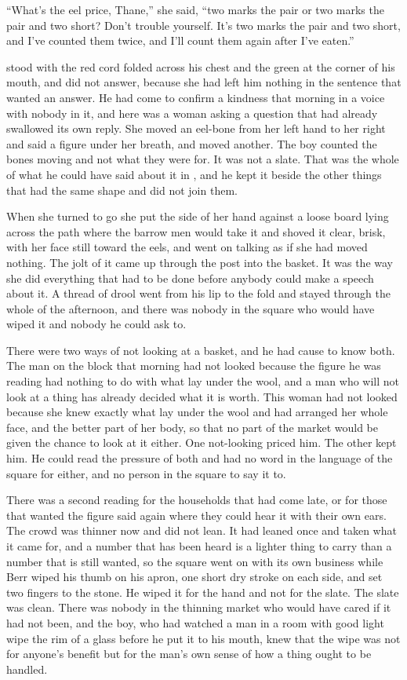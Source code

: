 “What's the eel price, Thane,” she said, “two marks the pair or two marks the pair and two short? Don't trouble yourself. It's two marks the pair and two short, and I've counted them twice, and I'll count them again after I've eaten.”

 stood with the red cord folded across his chest and the green at the corner of his mouth, and did not answer, because she had left him nothing in the sentence that wanted an answer. He had come to confirm a kindness that morning in a voice with nobody in it, and here was a woman asking a question that had already swallowed its own reply. She moved an eel-bone from her left hand to her right and said a figure under her breath, and moved another. The boy counted the bones moving and not what they were for. It was not a slate. That was the whole of what he could have said about it in , and he kept it beside the other things that had the same shape and did not join them.

When she turned to go she put the side of her hand against a loose board lying across the path where the barrow men would take it and shoved it clear, brisk, with her face still toward the eels, and went on talking as if she had moved nothing. The jolt of it came up through the post into the basket. It was the way she did everything that had to be done before anybody could make a speech about it. A thread of drool went from his lip to the fold and stayed through the whole of the afternoon, and there was nobody in the square who would have wiped it and nobody he could ask to.

There were two ways of not looking at a basket, and he had cause to know both. The man on the block that morning had not looked because the figure he was reading had nothing to do with what lay under the wool, and a man who will not look at a thing has already decided what it is worth. This woman had not looked because she knew exactly what lay under the wool and had arranged her whole face, and the better part of her body, so that no part of the market would be given the chance to look at it either. One not-looking priced him. The other kept him. He could read the pressure of both and had no word in the language of the square for either, and no person in the square to say it to.

\scenebreak

There was a second reading for the households that had come late, or for those that wanted the figure said again where they could hear it with their own ears. The crowd was thinner now and did not lean. It had leaned once and taken what it came for, and a number that has been heard is a lighter thing to carry than a number that is still wanted, so the square went on with its own business while Berr wiped his thumb on his apron, one short dry stroke on each side, and set two fingers to the stone. He wiped it for the hand and not for the slate. The slate was clean. There was nobody in the thinning market who would have cared if it had not been, and the boy, who had watched a man in a room with good light wipe the rim of a glass before he put it to his mouth, knew that the wipe was not for anyone's benefit but for the man's own sense of how a thing ought to be handled.

